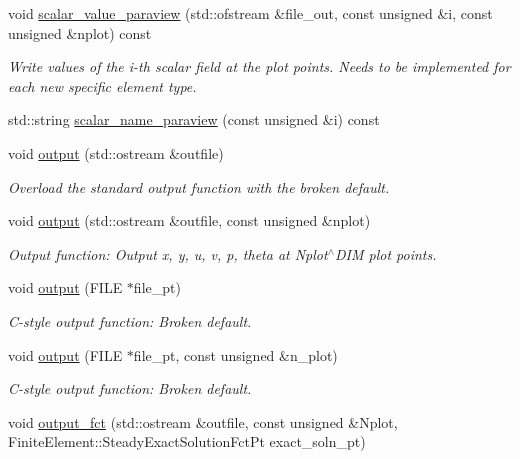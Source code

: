 \begin{DoxyCompactItemize}
void \hyperlink{classoomph_1_1AxisymmetricQAdvectionCrouzeixRaviartElement_a008a0cbad9479faefd5be4fc1d0e932a}{scalar\+\_\+value\+\_\+paraview} (std\+::ofstream \&file\+\_\+out, const unsigned \&i, const unsigned \&nplot) const
\begin{DoxyCompactList}\small\item\em Write values of the i-\/th scalar field at the plot points. Needs to be implemented for each new specific element type. \end{DoxyCompactList}\item 
std\+::string \hyperlink{classoomph_1_1AxisymmetricQAdvectionCrouzeixRaviartElement_adbdaca9b4a33c99be092098e5aabce45}{scalar\+\_\+name\+\_\+paraview} (const unsigned \&i) const
\item 
void \hyperlink{classoomph_1_1AxisymmetricQAdvectionCrouzeixRaviartElement_a157b747b92a9437b8bc599343bacc779}{output} (std\+::ostream \&outfile)
\begin{DoxyCompactList}\small\item\em Overload the standard output function with the broken default. \end{DoxyCompactList}\item 
void \hyperlink{classoomph_1_1AxisymmetricQAdvectionCrouzeixRaviartElement_a4988d5a8f363cb7c7a6d019f1fe7b72b}{output} (std\+::ostream \&outfile, const unsigned \&nplot)
\begin{DoxyCompactList}\small\item\em Output function\+: Output x, y, u, v, p, theta at Nplot$^\wedge$\+D\+IM plot points. \end{DoxyCompactList}\item 
void \hyperlink{classoomph_1_1AxisymmetricQAdvectionCrouzeixRaviartElement_ade2a7eba4740381ed2935149933b9efe}{output} (F\+I\+LE $\ast$file\+\_\+pt)
\begin{DoxyCompactList}\small\item\em C-\/style output function\+: Broken default. \end{DoxyCompactList}\item 
void \hyperlink{classoomph_1_1AxisymmetricQAdvectionCrouzeixRaviartElement_af682c147c15f87aecbbe7ed556f51ed8}{output} (F\+I\+LE $\ast$file\+\_\+pt, const unsigned \&n\+\_\+plot)
\begin{DoxyCompactList}\small\item\em C-\/style output function\+: Broken default. \end{DoxyCompactList}\item 
void \hyperlink{classoomph_1_1AxisymmetricQAdvectionCrouzeixRaviartElement_a18775406e3d1e0cb6bc1583af85c26fe}{output\+\_\+fct} (std\+::ostream \&outfile, const unsigned \&Nplot, Finite\+Element\+::\+Steady\+Exact\+Solution\+Fct\+Pt exact\+\_\+soln\+\_\+pt)

\end{DoxyCompactItemize}

